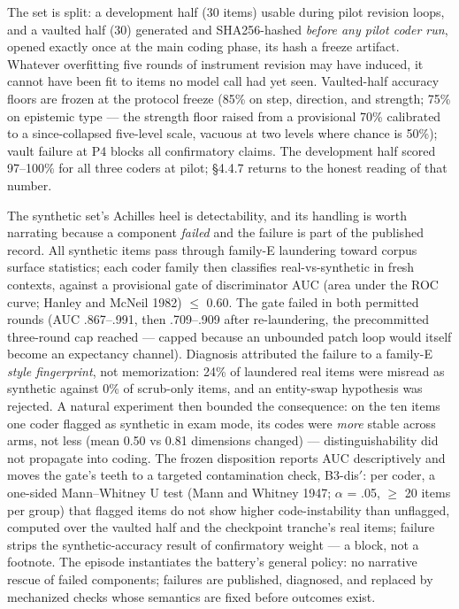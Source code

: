 The set is split: a development half (30 items) usable during pilot revision loops, and a vaulted half (30) generated and SHA256-hashed \emph{before any pilot coder run}, opened exactly once at the main coding phase, its hash a freeze artifact. Whatever overfitting five rounds of instrument revision may have induced, it cannot have been fit to items no model call had yet seen. Vaulted-half accuracy floors are frozen at the protocol freeze (85\% on step, direction, and strength; 75\% on epistemic type --- the strength floor raised from a provisional 70\% calibrated to a since-collapsed five-level scale, vacuous at two levels where chance is 50\%); vault failure at P4 blocks all confirmatory claims. The development half scored 97--100\% for all three coders at pilot; \S{}4.4.7 returns to the honest reading of that number.

The synthetic set's Achilles heel is detectability, and its handling is worth narrating because a component \emph{failed} and the failure is part of the published record. All synthetic items pass through family-E laundering toward corpus surface statistics; each coder family then classifies real-vs-synthetic in fresh contexts, against a provisional gate of discriminator AUC (area under the ROC curve; Hanley and McNeil 1982) $\le$ 0.60. The gate failed in both permitted rounds (AUC .867--.991, then .709--.909 after re-laundering, the precommitted three-round cap reached --- capped because an unbounded patch loop would itself become an expectancy channel). Diagnosis attributed the failure to a family-E \emph{style fingerprint}, not memorization: 24\% of laundered real items were misread as synthetic against 0\% of scrub-only items, and an entity-swap hypothesis was rejected. A natural experiment then bounded the consequence: on the ten items one coder flagged as synthetic in exam mode, its codes were \emph{more} stable across arms, not less (mean 0.50 vs 0.81 dimensions changed) --- distinguishability did not propagate into coding. The frozen disposition reports AUC descriptively and moves the gate's teeth to a targeted contamination check, B3-dis$'$: per coder, a one-sided Mann--Whitney U test (Mann and Whitney 1947; $\alpha$ = .05, $\ge$ 20 items per group) that flagged items do not show higher code-instability than unflagged, computed over the vaulted half and the checkpoint tranche's real items; failure strips the synthetic-accuracy result of confirmatory weight --- a block, not a footnote. The episode instantiates the battery's general policy: no narrative rescue of failed components; failures are published, diagnosed, and replaced by mechanized checks whose semantics are fixed before outcomes exist.

